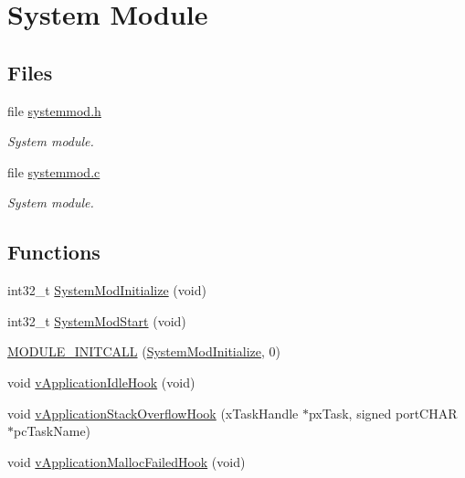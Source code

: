 \hypertarget{group___system_module}{\section{\-System \-Module}
\label{group___system_module}
}
\subsection*{\-Files}
\begin{DoxyCompactItemize}
\item 
file \hyperlink{systemmod_8h}{systemmod.\-h}
\begin{DoxyCompactList}\small\item\em \-System module. \end{DoxyCompactList}\item 
file \hyperlink{systemmod_8c}{systemmod.\-c}
\begin{DoxyCompactList}\small\item\em \-System module. \end{DoxyCompactList}\end{DoxyCompactItemize}
\subsection*{\-Functions}
\begin{DoxyCompactItemize}
\item 
int32\-\_\-t \hyperlink{group___system_module_ga25e6d9910d77be50c3b01c7b738094d9}{\-System\-Mod\-Initialize} (void)
\item 
int32\-\_\-t \hyperlink{group___system_module_gacce857283e17c1584c0944c872f40fce}{\-System\-Mod\-Start} (void)
\item 
\hyperlink{group___system_module_ga93b1d8678b35f3082f71ac804eca1619}{\-M\-O\-D\-U\-L\-E\-\_\-\-I\-N\-I\-T\-C\-A\-L\-L} (\hyperlink{group___system_module_ga25e6d9910d77be50c3b01c7b738094d9}{\-System\-Mod\-Initialize}, 0)
\item 
void \hyperlink{group___system_module_ga97fd430f36f8b065226e2bff9bad1de5}{v\-Application\-Idle\-Hook} (void)
\item 
void \hyperlink{group___system_module_ga329de0f973fabef8b34da6444654295c}{v\-Application\-Stack\-Overflow\-Hook} (x\-Task\-Handle $\ast$px\-Task, signed port\-C\-H\-A\-R $\ast$pc\-Task\-Name)
\item 
void \hyperlink{group___system_module_gab7e5c95cf72a3f819bc4462a7fb62ca3}{v\-Application\-Malloc\-Failed\-Hook} (void)
\end{DoxyCompactItemize}


